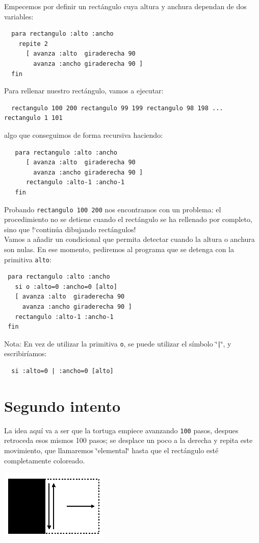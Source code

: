 \documentclass[12pt,twoside,spanish,a4paper]{report}
\begin{document}
Empecemos por definir un rect\'angulo cuya altura y anchura dependan
de dos variables:
\begin{verbatim}
  para rectangulo :alto :ancho
    repite 2
      [ avanza :alto  giraderecha 90
        avanza :ancho giraderecha 90 ]
  fin \end{verbatim}
Para rellenar nuestro rect\'angulo, vamos a ejecutar:
\begin{verbatim}
  rectangulo 100 200 rectangulo 99 199 rectangulo 98 198 ... rectangulo 1 101  \end{verbatim}
\noindent algo que conseguimos de forma recursiva haciendo:
\begin{verbatim}
   para rectangulo :alto :ancho
      [ avanza :alto  giraderecha 90
        avanza :ancho giraderecha 90 ]
      rectangulo :alto-1 :ancho-1
   fin \end{verbatim}

Probando \texttt{rectangulo 100 200} nos encontramos con un problema:
el procedimiento no se detiene cuando el rect\'angulo se ha rellenado
por completo, sino que !`contin\'ua dibujando rect\'angulos! \\

Vamos a a\~nadir un condicional que permita detectar cuando la altura
o anchura son nulas. En ese momento, pediremos al programa que se
detenga con la primitiva \texttt{alto}:
\begin{verbatim}
 para rectangulo :alto :ancho
   si o :alto=0 :ancho=0 [alto]
   [ avanza :alto  giraderecha 90
     avanza :ancho giraderecha 90 ]
   rectangulo :alto-1 :ancho-1
 fin \end{verbatim}
Nota: En vez de utilizar la primitiva \texttt{o}, se puede utilizar el
s\'imbolo \char`\"{}\texttt{|}\char`\"{}, y escribir\'iamos:
\begin{verbatim}
  si :alto=0 | :ancho=0 [alto] \end{verbatim}

\section{Segundo intento}
   \label{sub:Segundo-intento}

% 
La idea aqu\'i va a ser que la tortuga empiece avanzando \texttt{100} pasos,
despues retroceda esos mismos 100 pasos; se desplace un poco a la
derecha y repita este movimiento, que llamaremos \char`\"{}elemental\char`\"{}
hasta que el rect\'angulo est\'e completamente coloreado.
\noindent \begin{center}
   \includegraphics[scale=0.75]{Imagenes_Tutorial/11_Recursividad_2}
\end{center}
\end{document}
